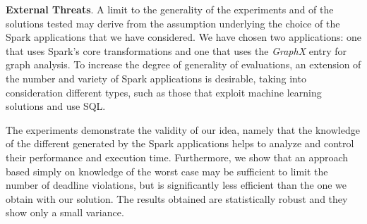\textbf{External Threats}. A limit to the generality of the experiments and of the solutions tested may derive from the assumption underlying the choice of the Spark applications that we have considered. We have chosen two applications: one that uses Spark's core transformations and one that uses the \textit{GraphX} entry for graph analysis. To increase the degree of generality of evaluations, an extension of the number and variety of Spark applications is desirable, taking into consideration different types, such as those that exploit machine learning solutions and use SQL.


The experiments demonstrate the validity of our idea, namely that the knowledge of the different \plans generated by the Spark applications helps to analyze and control their performance and execution time. Furthermore, we show that an approach based simply on knowledge of the worst case may be sufficient to limit the number of deadline violations, but is significantly less efficient than the one we obtain with our solution. The results obtained are statistically robust and they show only a small variance. 
